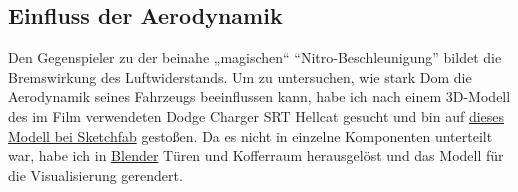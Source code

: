 \subsection{Einfluss der Aerodynamik}
Den Gegenspieler zu der beinahe „magischen“ \enquote{Nitro-Beschleunigung} bildet die Bremswirkung des Luftwiderstands. Um zu untersuchen, wie stark Dom die Aerodynamik seines Fahrzeugs beeinflussen kann, habe ich nach einem 3D-Modell des im Film verwendeten Dodge Charger SRT Hellcat gesucht und bin auf \href{https://sketchfab.com/3d-models/dodge-charger-srt-hellcat-high-quality-b222b6cb1d2c485293546b4157f48ecf}{dieses Modell bei Sketchfab} gestoßen. Da es nicht in einzelne Komponenten unterteilt war, habe ich in \href{https://www.blender.org/about/}{Blender} Türen und Kofferraum herausgelöst und das Modell für die Visualisierung gerendert.  
\\
